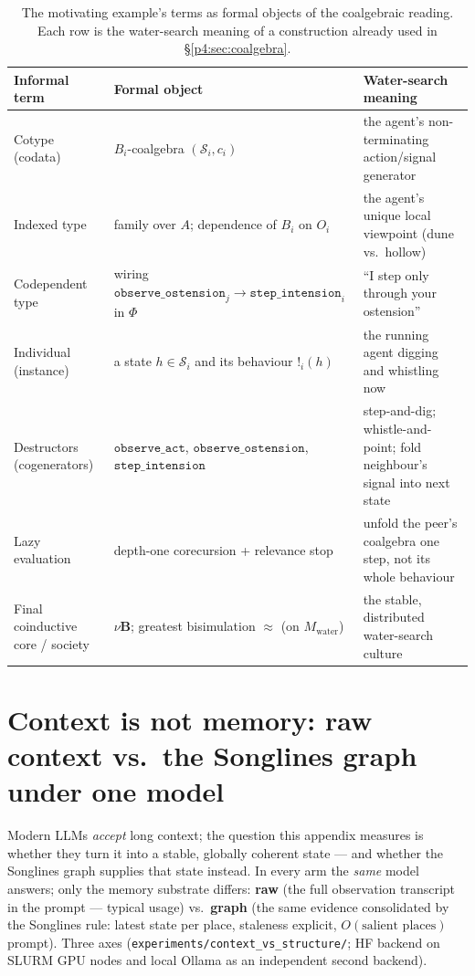 \documentclass{article}
\newcommand{\method}[1]{\texttt{#1}}
\begin{document}
\begin{table}[t]
\caption{The motivating example's terms as formal objects of the coalgebraic
reading. Each row is the water-search meaning of a construction already used
in \S\ref{p4:sec:coalgebra}.}
\label{p4:tab:coalg-dictionary}
\centering
\small
\begin{tabular}{p{2.9cm} p{4.3cm} p{4.4cm}}
\toprule
Informal term & Formal object & Water-search meaning \\
\midrule
Cotype (codata) & $B_i$-coalgebra $(\mathcal{S}_i,c_i)$ & the agent's non-terminating action/signal generator \\
Indexed type & family over $A$; dependence of $B_i$ on $O_i$ & the agent's unique local viewpoint (dune vs.\ hollow) \\
Codependent type & wiring $\method{observe\_ostension}_j\!\to\!\method{step\_intension}_i$ in $\Phi$ & ``I step only through your ostension'' \\
Individual (instance) & a state $h\in\mathcal{S}_i$ and its behaviour $!_i(h)$ & the running agent digging and whistling now \\
Destructors (cogenerators) & $\method{observe\_act}$, $\method{observe\_ostension}$, $\method{step\_intension}$ & step-and-dig; whistle-and-point; fold neighbour's signal into next state \\
Lazy evaluation & depth-one corecursion + relevance stop & unfold the peer's coalgebra one step, not its whole behaviour \\
Final coinductive core / society & $\nu\mathbf{B}$; greatest bisimulation $\approx$ (on $M_{\mathrm{water}}$) & the stable, distributed water-search culture \\
\bottomrule
\end{tabular}
\end{table}


\section{Context is not memory: raw context vs.\ the Songlines graph under one model}
\label{p4:app:ctx-vs-structure}

Modern LLMs \emph{accept} long context; the question this appendix measures is
whether they turn it into a stable, globally coherent state --- and whether the
Songlines graph supplies that state instead. In every arm the \emph{same} model
answers; only the memory substrate differs: \textbf{raw} (the full observation
transcript in the prompt --- typical usage) vs.\ \textbf{graph} (the same
evidence consolidated by the Songlines rule: latest state per place, staleness
explicit, $O(\text{salient places})$ prompt). Three axes
(\method{experiments/context\_vs\_structure/}; HF backend on SLURM GPU nodes
and local Ollama as an independent second backend).
\end{document}
